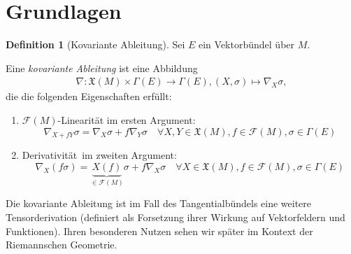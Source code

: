 \documentclass[a4paper]{scrreprt}
\numberwithin{equation}{chapter}
\newcommand{\sm}{\mathcal{F}}
\newcommand{\vf}{\mathfrak{X}}
\theoremstyle{definition}
\newtheorem{defn}{Definition}[section]
\begin{document}
	\section{Grundlagen}
		\begin{defn}[Kovariante Ableitung]Sei $E$ ein Vektorbündel über $M$.
		
			Eine \emph{kovariante Ableitung} ist eine Abbildung
			\begin{align*}
				\nabla\colon \vf(M)\times\Gamma(E)\rightarrow\Gamma(E), (X,\sigma)\mapsto \nabla_X \sigma,
			\end{align*}
			die die folgenden Eigenschaften erfüllt:
			\begin{enumerate}[label=\arabic*]
				\item $\sm(M)$-Linearität im ersten Argument: 
				\begin{equation*}
					\nabla_{X+fY}\sigma=\nabla_X\sigma+f\nabla_Y \sigma\quad\forall X,Y\in\vf(M), f\in\sm(M),\sigma\in\Gamma(E)
				\end{equation*}
				\item \glqq Derivativität\grqq\ im zweiten Argument: 
				\begin{equation*}
					\nabla_X(f\sigma)=\underbrace{X(f)}_{\in\sm(M)} \sigma+f\nabla_X \sigma\quad\forall X\in\vf(M), f\in\sm(M),\sigma\in\Gamma(E)
				\end{equation*}
			\end{enumerate}
		\end{defn}
		Die kovariante Ableitung ist im Fall des Tangentialbündels eine weitere Tensorderivation (definiert als Forsetzung ihrer Wirkung auf Vektorfeldern und Funktionen). Ihren besonderen Nutzen sehen wir später im Kontext der Riemannschen Geometrie.
		
\end{document}
